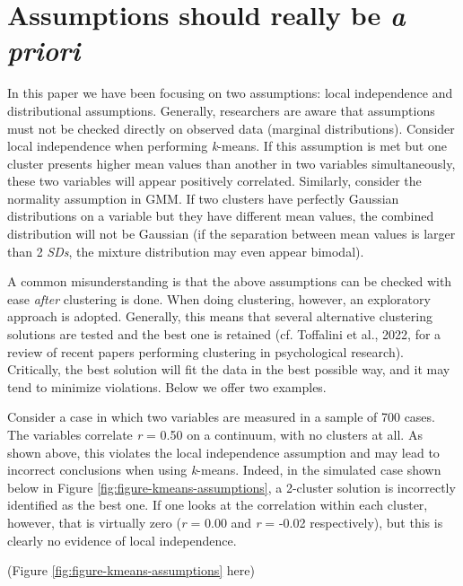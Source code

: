 \documentclass[
  man,floatsintext]{apa6}
\begin{document}
\hypertarget{assumptions-should-really-be-a-priori}{%
\section{\texorpdfstring{Assumptions should really be \emph{a priori}}{Assumptions should really be a priori}}\label{assumptions-should-really-be-a-priori}}

In this paper we have been focusing on two assumptions: local independence and distributional assumptions. Generally, researchers are aware that assumptions must not be checked directly on observed data (marginal distributions). Consider local independence when performing \emph{k}-means. If this assumption is met but one cluster presents higher mean values than another in two variables simultaneously, these two variables will appear positively correlated. Similarly, consider the normality assumption in GMM. If two clusters have perfectly Gaussian distributions on a variable but they have different mean values, the combined distribution will not be Gaussian (if the separation between mean values is larger than 2 \emph{SDs}, the mixture distribution may even appear bimodal).

A common misunderstanding is that the above assumptions can be checked with ease \emph{after} clustering is done. When doing clustering, however, an exploratory approach is adopted. Generally, this means that several alternative clustering solutions are tested and the best one is retained (cf. Toffalini et al., 2022, for a review of recent papers performing clustering in psychological research). Critically, the best solution will fit the data in the best possible way, and it may tend to minimize violations. Below we offer two examples.

Consider a case in which two variables are measured in a sample of 700 cases. The variables correlate \emph{r} = 0.50 on a continuum, with no clusters at all. As shown above, this violates the local independence assumption and may lead to incorrect conclusions when using \emph{k}-means. Indeed, in the simulated case shown below in Figure \ref{fig:figure-kmeans-assumptions}, a 2-cluster solution is incorrectly identified as the best one. If one looks at the correlation within each cluster, however, that is virtually zero (\emph{r} = 0.00 and \emph{r} = -0.02 respectively), but this is clearly no evidence of local independence.

(Figure \ref{fig:figure-kmeans-assumptions} here)
\end{document}
